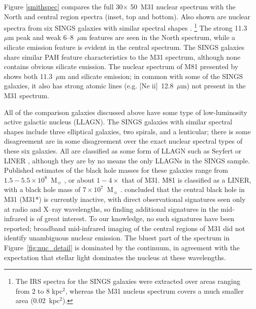 Figure \ref{smithspec} compares the full 30\arcsec $\times$ 50\arcsec\ M31 nuclear spectrum with
the North and central region spectra (inset, top and bottom). Also shown are nuclear spectra
from six SINGS galaxies with similar spectral shapes \citep{Smith:2007lr}.%
\footnote{The IRS spectra for the SINGS galaxies were extracted over areas ranging from 2 to 8 kpc$^2$, whereas the M31
nucleus spectrum covers a much smaller area (0.02~kpc$^2$).}
The strong 11.3~$\mu$m peak  and weak 6--8~$\mu$m features are  seen  in the
North spectrum, while a silicate emission feature is evident in the central spectrum.
The SINGS galaxies share similar PAH feature characteristics to the M31 spectrum, although none
contains obvious silicate emission. The nuclear spectrum of M81 presented by \citet{Smith2010}
shows both 11.3~$\mu$m  and silicate emission; in common with some of the SINGS galaxies,
it also has strong atomic lines (e.g. [Ne {\sc ii}]~12.8~$\mu$m) not present in the M31 spectrum.


All of the comparison galaxies discussed above have some type of low-luminosity active galactic nucleus (LLAGN).
The SINGS galaxies with similar spectral shapes include  three elliptical galaxies, two spirals, and a lenticular;
there is some disagreement  \citep{kennicutt03,Smith:2007lr, moustakas2010} are in some disagreement over the
exact nuclear spectral types of these six galaxies.  All are classified as some form of LLAGN
such as Seyfert or LINER \citep[luminous AGNs were intentionally omitted from the SINGS sample;][]{kennicutt03}, although they are
by no means the only LLAGNs in the SINGS sample.
Published estimates of the black hole masses for these galaxies range from $1.5-5.5\times10^{8}$~M$_{\sun}$
\citep[for NGC~1316 and NGC~4595, respectively]{nowak08, kormendy88}, or about $1-4\times$ that of M31.
M81 is classified as a LINER, with a black hole mass of $7\times10^7$~M$_{\sun}$ \citep{devereux03}.
\citet{Li09} concluded that the central black hole in M31 (M31*) is currently inactive, with direct observational signatures seen only
at radio and X--ray wavelengths, so finding additional signatures in the mid-infrared is of great interest.
To our knowledge, no such signatures have been reported; broadband mid-infrared imaging of the central 
regions of M31 \citep{davidge06,Barmby2006lr} did not identify unambiguous nuclear emission. The bluest
part of the spectrum in Figure~\ref{fig:nuc_detail} is dominated by the  continuum, in agreement with the
expectation that stellar light dominates the nucleus at these wavelengths.


